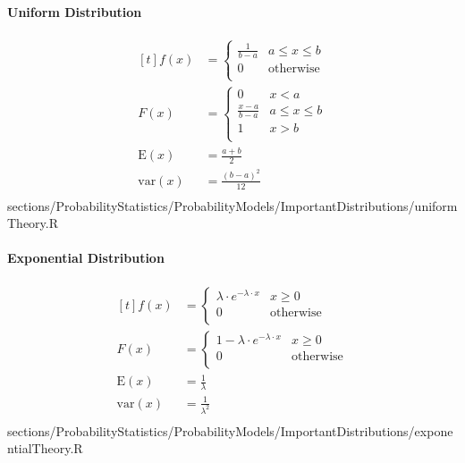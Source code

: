 			\paragraph{Uniform Distribution}
				\RTheory%
				{%
					$$\begin{aligned}[t]
						f(x) 			&= 	\begin{cases}
												\frac{1}{b - a} 	& a \leq x \leq b\\
												0					& \mathrm{otherwise}\\ 
											\end{cases}\\
						F(x) 			&= 	\begin{cases}
												0					& x < a\\
												\frac{x-a}{b - a} 	& a \leq x \leq b\\
												1					& x > b\\ 
											\end{cases}\\
						\mathrm{E}(x) 	&= \frac{a+b}{2}\\
						\mathrm{var}(x) &= \frac{(b-a)^2}{12}\\
					\end{aligned}$$
				}{sections/ProbabilityStatistics/ProbabilityModels/ImportantDistributions/uniformTheory.R}
				
				\paragraph{Exponential Distribution}
				\RTheory%
				{%
					$$\begin{aligned}[t]
						f(x) 			&= 	\begin{cases}
												\lambda\cdot e^{-\lambda\cdot x} 	& x \geq 0\\
												0					& \mathrm{otherwise}\\ 
											\end{cases}\\
						F(x) 			&= 	\begin{cases}
												1- \lambda\cdot e^{-\lambda\cdot x} 	& x \geq 0\\
												0					& \mathrm{otherwise}\\ 
											\end{cases}\\
						\mathrm{E}(x) 	&= \frac{1}{\lambda}\\
						\mathrm{var}(x) &= \frac{1}{\lambda^2}\\
					\end{aligned}$$
				}{sections/ProbabilityStatistics/ProbabilityModels/ImportantDistributions/exponentialTheory.R}